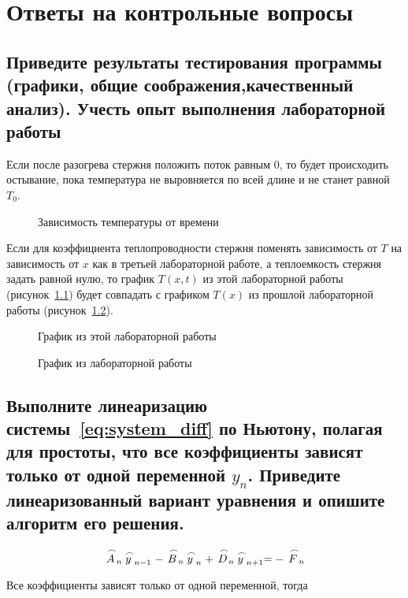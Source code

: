 \chapter{Ответы на контрольные вопросы}

\section{Приведите результаты тестирования программы (графики, общие соображения,качественный анализ). Учесть опыт выполнения лабораторной работы }

Если после разогрева стержня положить поток равным 0, то будет происходить остывание, пока температура не выровняется по всей длине и не станет равной $T_0$.
\begin{figure}[H]
    \caption{Зависимость температуры от времени}
    
\end{figure}

Если для коэффициента теплопроводности стержня поменять зависимость от $T$ на зависимость от $x$ как в третьей лабораторной работе, а теплоемкость стержня задать равной нулю, то график $T(x, t)$ из этой лабораторной работы (рисунок~\ref{img:lab_04}) будет совпадать с графиком $T(x)$ из прошлой лабораторной работы (рисунок~\ref{img:lab_03}).
\begin{figure}[H]
    \caption{График из этой лабораторной работы}\label{img:lab_04}
    
\end{figure}
\begin{figure}[H]
    \caption{График из лабораторной работы }\label{img:lab_03}
    
\end{figure}

\section{Выполните линеаризацию системы~\ref{eq:system_diff} по Ньютону, полагая для простоты, что все коэффициенты зависят только от одной переменной $y_n$. Приведите линеаризованный вариант уравнения и опишите алгоритм его решения.}\label{question2}

\begin{equation*}
        \LittleCap{A}_n \LittleCap{y}_{n-1} - \LittleCap{B}_n \LittleCap{y}_n + \LittleCap{D}_n \LittleCap{y}_{n+1} = -\LittleCap{F}_n
    \end{equation*}

    Все коэффициенты зависят только от одной переменной, тогда

